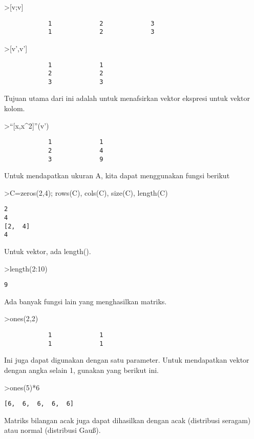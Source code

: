 \documentclass[
]{book}
\begin{document}
\textgreater{[}v;v{]}

\begin{verbatim}
            1             2             3 
            1             2             3 
\end{verbatim}

\textgreater{[}v',v'{]}

\begin{verbatim}
            1             1 
            2             2 
            3             3 
\end{verbatim}

Tujuan utama dari ini adalah untuk menafsirkan vektor ekspresi untuk vektor kolom.

\textgreater{}``{[}x,x\^{}2{]}''(v')

\begin{verbatim}
            1             1 
            2             4 
            3             9 
\end{verbatim}

Untuk mendapatkan ukuran A, kita dapat menggunakan fungsi berikut

\textgreater C=zeros(2,4); rows(C), cols(C), size(C), length(C)

\begin{verbatim}
2
4
[2,  4]
4
\end{verbatim}

Untuk vektor, ada length().

\textgreater length(2:10)

\begin{verbatim}
9
\end{verbatim}

Ada banyak fungsi lain yang menghasilkan matriks.

\textgreater ones(2,2)

\begin{verbatim}
            1             1 
            1             1 
\end{verbatim}

Ini juga dapat digunakan dengan satu parameter. Untuk mendapatkan vektor dengan angka selain 1, gunakan yang berikut ini.

\textgreater ones(5)*6

\begin{verbatim}
[6,  6,  6,  6,  6]
\end{verbatim}

Matriks bilangan acak juga dapat dihasilkan dengan acak (distribusi seragam) atau normal (distribusi Gauß).
\end{document}
